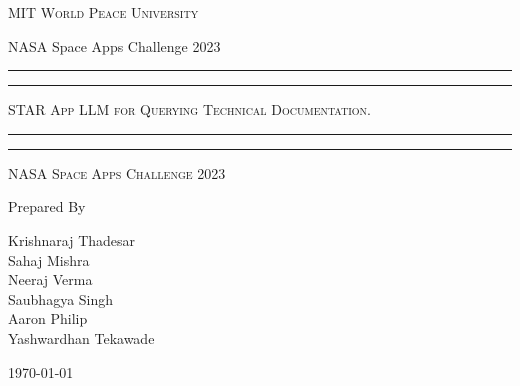 \documentclass[11pt]{article}
\begin{document}
\begin{titlepage}
	\centering


	\huge\textsc{
		MIT World Peace University
	}\\

	\vspace{0.75\baselineskip} %

	\LARGE{
		NASA Space Apps Challenge 2023
	}

	\vfill %


	\rule{\textwidth}{1.6pt}\vspace*{-\baselineskip}\vspace*{2pt}
	\rule{\textwidth}{0.6pt}
	\vspace{0.75\baselineskip} %



	\huge{\textsc{
			STAR App LLM for Querying Technical Documentation.
		}} \\


	\vspace{0.5\baselineskip} %
	\rule{\textwidth}{0.6pt}\vspace*{-\baselineskip}\vspace*{2.8pt}
	\rule{\textwidth}{1.6pt}

	\vspace{1\baselineskip} %


	\LARGE\textsc{
		NASA Space Apps Challenge 2023
	} %
	\vfill


	Prepared By
	\vspace{0.5\baselineskip} %

	\Large{
		Krishnaraj Thadesar \\
		Sahaj Mishra \\
		Neeraj Verma  \\
		Saubhagya Singh \\
		Aaron Philip \\
		Yashwardhan Tekawade \\
	}


	\vspace{0.5\baselineskip} %
	\today

\end{titlepage}
\end{document}
